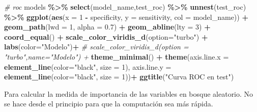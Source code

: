 \documentclass[12pt,a4paper,]{book}
\newenvironment{Shaded}{\begin{snugshade}}{\end{snugshade}}
\newcommand{\AttributeTok}[1]{\textcolor[rgb]{0.13,0.29,0.53}{#1}}
\newcommand{\CommentTok}[1]{\textcolor[rgb]{0.56,0.35,0.01}{\textit{#1}}}
\newcommand{\DecValTok}[1]{\textcolor[rgb]{0.00,0.00,0.81}{#1}}
\newcommand{\FloatTok}[1]{\textcolor[rgb]{0.00,0.00,0.81}{#1}}
\newcommand{\FunctionTok}[1]{\textcolor[rgb]{0.13,0.29,0.53}{\textbf{#1}}}
\newcommand{\NormalTok}[1]{#1}
\newcommand{\SpecialCharTok}[1]{\textcolor[rgb]{0.81,0.36,0.00}{\textbf{#1}}}
\newcommand{\StringTok}[1]{\textcolor[rgb]{0.31,0.60,0.02}{#1}}
\numberwithin{dummy}{section}
\theoremstyle{ocrenumbox}
\theoremstyle{blacknumex}
\theoremstyle{blacknumbox}
\theoremstyle{ocrenum}
\theoremstyle{ocrenum}
\begin{document}
\begin{Shaded}
\begin{Highlighting}[]
\CommentTok{\# roc}
\NormalTok{models }\SpecialCharTok{\%\textgreater{}\%} \FunctionTok{select}\NormalTok{(model\_name,test\_roc) }\SpecialCharTok{\%\textgreater{}\%} \FunctionTok{unnest}\NormalTok{(test\_roc) }\SpecialCharTok{\%\textgreater{}\%} 
  \FunctionTok{ggplot}\NormalTok{(}\FunctionTok{aes}\NormalTok{(}\AttributeTok{x =} \DecValTok{1} \SpecialCharTok{{-}}\NormalTok{ specificity, }\AttributeTok{y =}\NormalTok{ sensitivity, }\AttributeTok{col =}\NormalTok{ model\_name)) }\SpecialCharTok{+} 
  \FunctionTok{geom\_path}\NormalTok{(}\AttributeTok{lwd =} \DecValTok{1}\NormalTok{, }\AttributeTok{alpha =} \FloatTok{0.7}\NormalTok{) }\SpecialCharTok{+}
  \FunctionTok{geom\_abline}\NormalTok{(}\AttributeTok{lty =} \DecValTok{3}\NormalTok{) }\SpecialCharTok{+} 
  \FunctionTok{coord\_equal}\NormalTok{() }\SpecialCharTok{+} 
  \FunctionTok{scale\_color\_viridis\_d}\NormalTok{(}\AttributeTok{option=}\StringTok{"turbo"}\NormalTok{) }\SpecialCharTok{+}
  \FunctionTok{labs}\NormalTok{(}\AttributeTok{color=}\StringTok{"Modelo"}\NormalTok{)}\SpecialCharTok{+}
  \CommentTok{\# scale\_color\_viridis\_d(option = "turbo",name="Modelo") +}
  \FunctionTok{theme\_minimal}\NormalTok{() }\SpecialCharTok{+} 
  \FunctionTok{theme}\NormalTok{(}\AttributeTok{axis.line.x =} \FunctionTok{element\_line}\NormalTok{(}\AttributeTok{color=}\StringTok{"black"}\NormalTok{, }\AttributeTok{size =} \DecValTok{1}\NormalTok{),}
        \AttributeTok{axis.line.y =} \FunctionTok{element\_line}\NormalTok{(}\AttributeTok{color=}\StringTok{"black"}\NormalTok{, }\AttributeTok{size =} \DecValTok{1}\NormalTok{))}\SpecialCharTok{+}
  \FunctionTok{ggtitle}\NormalTok{(}\StringTok{"Curva ROC en test"}\NormalTok{)}
\end{Highlighting}
\end{Shaded}

Para calcular la medida de importancia de las variables en bosque
aleatorio. No se hace desde el principio para que la computación sea más
rápida.
\end{document}

